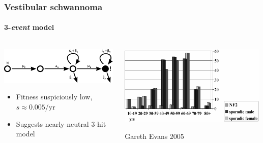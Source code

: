 \documentclass{beamer}
\begin{document}
\begin{frame}
    \frametitle{Vestibular schwannoma}
    \framesubtitle{3-\emph{event} model}

    \begin{columns}
        \begin{column}{0.5\textwidth}
        \includegraphics[width=0.99\textwidth]{figures/diagram3}

        \begin{itemize}
            \item Fitness suspiciously low, $s \approx 0.005$/yr
            \footnotemark[1]
            \item Suggests nearly-neutral 3-hit model
            \footnotemark[3]
        \end{itemize}
        \end{column}
        \begin{column}{0.5\textwidth}
        \includegraphics[width=0.99\textwidth]{figures/DGREvans2005}
        \begin{center}
            \small{Gareth Evans 2005\footnotemark[2]}
        \end{center}
        \end{column}
    \end{columns}

\end{frame}
\end{document}

